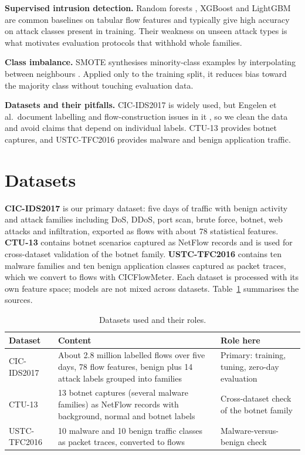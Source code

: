 \documentclass[conference]{IEEEtran}
\begin{document}
\textbf{Supervised intrusion detection.} Random forests \cite{breiman2001random}, XGBoost \cite{chen2016xgboost} and LightGBM \cite{ke2017lightgbm} are common baselines on tabular flow features and typically give high accuracy on attack classes present in training. Their weakness on unseen attack types is what motivates evaluation protocols that withhold whole families.

\textbf{Class imbalance.} SMOTE synthesises minority-class examples by interpolating between neighbours \cite{chawla2002smote}. Applied only to the training split, it reduces bias toward the majority class without touching evaluation data.

\textbf{Datasets and their pitfalls.} CIC-IDS2017 \cite{sharafaldin2018toward} is widely used, but Engelen et al.\ document labelling and flow-construction issues in it \cite{engelen2021troubleshooting}, so we clean the data and avoid claims that depend on individual labels. CTU-13 \cite{garcia2014empirical} provides botnet captures, and USTC-TFC2016 \cite{wang2017malware} provides malware and benign application traffic.

\section{Datasets}
\textbf{CIC-IDS2017} is our primary dataset: five days of traffic with benign activity and attack families including DoS, DDoS, port scan, brute force, botnet, web attacks and infiltration, exported as flows with about 78 statistical features. \textbf{CTU-13} contains botnet scenarios captured as NetFlow records and is used for cross-dataset validation of the botnet family. \textbf{USTC-TFC2016} contains ten malware families and ten benign application classes captured as packet traces, which we convert to flows with CICFlowMeter. Each dataset is processed with its own feature space; models are not mixed across datasets. Table~\ref{tab:data} summarises the sources.

\begin{table}[!htb]
\caption{Datasets used and their roles.}
\label{tab:data}
\centering\footnotesize
\begin{tabular}{@{}p{1.55cm}p{3.2cm}p{3.4cm}@{}}
\hline
Dataset & Content & Role here \\
\hline
CIC-IDS2017 & About 2.8 million labelled flows over five days, 78 flow features, benign plus 14 attack labels grouped into families & Primary: training, tuning, zero-day evaluation \\
CTU-13 & 13 botnet captures (several malware families) as NetFlow records with background, normal and botnet labels & Cross-dataset check of the botnet family \\
USTC-TFC2016 & 10 malware and 10 benign traffic classes as packet traces, converted to flows & Malware-versus-benign check \\
\hline
\end{tabular}
\end{table}
\end{document}
